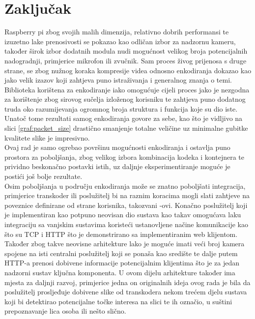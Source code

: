 \section{Zaključak}
Raspberry pi zbog svojih malih dimenzija, relativno dobrih performansi te izuzetno lake prenosivosti se pokazao kao
odličan izbor za nadzornu kameru, također širok izbor dodatnih modula nudi mogućnost velikog broja potencijalnih
nadogradnji, primjerice mikrofon ili zvučnik.
\paraBreak
Sam proces živog prijenosa s druge strane, se zbog nužnog koraka kompresije videa odnosno enkodiranja dokazao
kao jako velik izazov koji zahtjeva puno istraživanja i generalnog znanja o temi. Biblioteka korištena za enkodiranje
iako omogućuje cijeli proces jako je nezgodna za korištenje zbog sirovog sučelja izloženog korisniku te zahtjeva
puno dodatnog truda oko razumijevanja ogromnog broja struktura i funkcija koje su dio iste.
\\
Unatoč tome rezultati samog enkodiranja govore za sebe, kao što je vidljivo na slici \ref{graf:packet_size} 
drastično smanjenje totalne veličine uz minimalne gubitke  kvalitete slike je impresivno.
\\
Ovaj rad je samo ogrebao površinu mogućnosti enkodiranja i ostavlja puno prostora za poboljšanja, zbog velikog izbora
kombinacija kodeka i kontejnera te prividno beskonačno postavki istih, uz daljnje eksperimentiranje moguće je
postići još bolje rezultate.
\\
Osim poboljšanja u području enkodiranja može se znatno poboljšati integracija, primjerice transkoder ili poslužitelj 
bi na raznim koracima mogli slati zahtjeve na poveznice definirane od strane korisnika, takozvani -ovi.
\paraBreak
Konačno poslužitelj koji je implementiran kao potpuno neovisan dio sustava kao takav omogućava laku integraciju sa
vanjskim sustavima koristeći ustanovljene načine komunikacije kao što su TCP i HTTP što je demonstrirano sa
implementiranim web klijentom.
\\
Također zbog takve neovisne arhitekture lako je moguće imati veći broj kamera spojene na isti centralni poslužitelj 
koji se ponaša kao središte te dalje putem HTTP-a prenosi dobivene informacije potencijalnim klijentima što je za jedan 
nadzorni sustav ključna komponenta. U ovom dijelu arhitekture također ima mjesta za daljnji razvoj, primjerice jedna on 
originalnih ideja ovog rada je bila da poslužitelj prosljeđuje dobivene slike od transkodera nekom trećem djelu sustava koji
bi detektirao potencijalne točke interesa na slici te ih označio, u suštini prepoznavanje lica osoba ili nešto slično.

